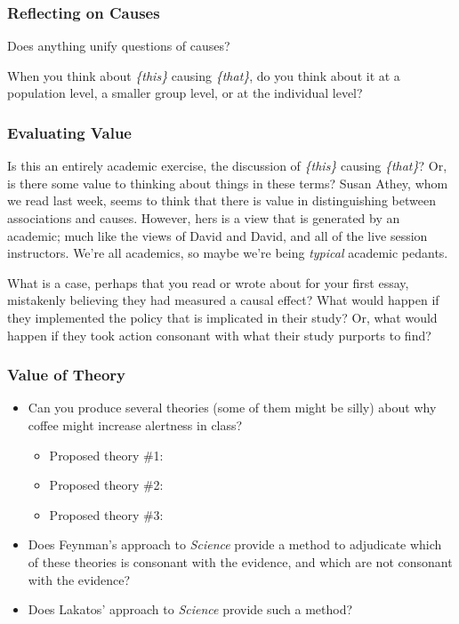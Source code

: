 \documentclass[
]{article}
\providecommand{\tightlist}{%
  \setlength{\itemsep}{0pt}\setlength{\parskip}{0pt}}
\theoremstyle{definition}
\theoremstyle{definition}
\theoremstyle{definition}
\theoremstyle{definition}
\theoremstyle{remark}
\begin{document}
\subsubsection{Reflecting on Causes}\label{reflecting-on-causes}

Does anything unify questions of causes?

When you think about \emph{\{this\}} causing \emph{\{that\}}, do you think about it at a population level, a smaller group level, or at the individual level?

\subsubsection{Evaluating Value}\label{evaluating-value}

Is this an entirely academic exercise, the discussion of \emph{\{this\}} causing \emph{\{that\}}? Or, is there some value to thinking about things in these terms? Susan Athey, whom we read last week, seems to think that there is value in distinguishing between associations and causes. However, hers is a view that is generated by an academic; much like the views of David and David, and all of the live session instructors. We're all academics, so maybe we're being \emph{typical} academic pedants.

What is a case, perhaps that you read or wrote about for your first essay, mistakenly believing they had measured a causal effect? What would happen if they implemented the policy that is implicated in their study? Or, what would happen if they took action consonant with what their study purports to find?

\subsubsection{Value of Theory}\label{value-of-theory}

\begin{itemize}
\tightlist
\item
  Can you produce several theories (some of them might be silly) about why coffee might increase alertness in class?

  \begin{itemize}
  \tightlist
  \item
    Proposed theory \#1:
  \item
    Proposed theory \#2:
  \item
    Proposed theory \#3:
  \end{itemize}
\item
  Does Feynman's approach to \emph{Science} provide a method to adjudicate which of these theories is consonant with the evidence, and which are not consonant with the evidence?
\item
  Does Lakatos' approach to \emph{Science} provide such a method?
\end{itemize}
\end{document}
